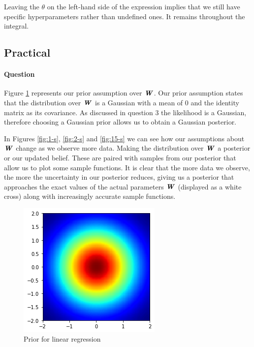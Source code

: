 \documentclass{article}
\newcounter{question}
\newcommand{\question}{\stepcounter{question}\paragraph{Question \thequestion}}
\newcommand{\mat}[1]{\textbf{\textit{#1}}}
\begin{document}
Leaving the $\theta$ on the left-hand side of the expression implies that we still have specific hyperparameters rather than undefined ones. It remains throughout the integral.
\subsection{Practical}
\question Figure \ref{fig:prior} represents our prior assumption over $\mat{W}$. Our prior assumption states that the distribution over $\mat{W}$ is a Gaussian with a mean of $0$ and the identity matrix as its covariance. As discussed in question 3 the likelihood is a Gaussian, therefore choosing a Gaussian prior allows us to obtain a Gaussian posterior.

In Figures \ref{fig:1-s}, \ref{fig:2-s} and \ref{fig:15-s} we can see how our assumptions about $\mat{W}$ change as we observe more data. Making the distribution over $\mat{W}$ a posterior or our updated belief. These are paired with samples from our posterior that allow us to plot some sample functions. It is clear that the more data we observe, the more the uncertainty in our posterior reduces, giving us a posterior that approaches the exact values of the actual parameters $\mat{W}$ (displayed as a white cross) along with increasingly accurate sample functions.
\begin{figure}[H]
	\centering
	\includegraphics[width=0.3\linewidth]{prior}
	\caption{Prior for linear regression}
	\label{fig:prior}
\end{figure}
\end{document}
